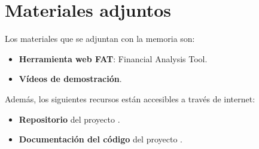 \section{Materiales adjuntos}\label{materiales-adjuntos}

Los materiales que se adjuntan con la memoria son: 

\begin{itemize}
\tightlist
\item
	\textbf{Herramienta web FAT}: Financial Analysis Tool\citep{online:FAT_web}.
\item	
	\textbf{Vídeos de demostración}.
\end{itemize}

Además, los siguientes recursos están accesibles a través de internet:

\begin{itemize}
\tightlist
\item
  \textbf{Repositorio} del proyecto \citep{online:FAT_repo}.
\item
  \textbf{Documentación del código} del proyecto \citep{online:FAT_read_docs}.
\end{itemize}


